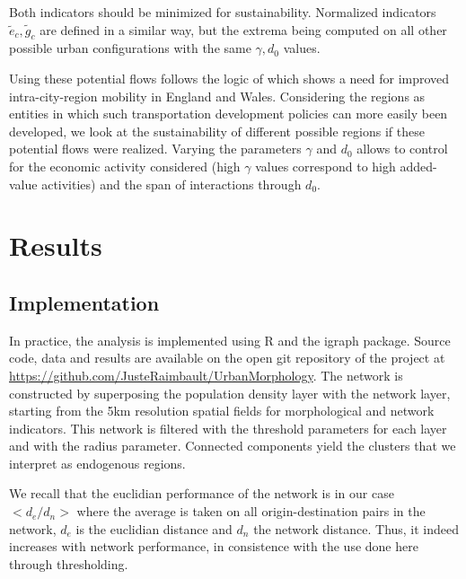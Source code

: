 \documentclass{jimis-en}
\begin{document}
Both indicators should be minimized for sustainability. Normalized indicators $\tilde{e}_c,\tilde{g}_c$ are defined in a similar way, but the extrema being computed on all other possible urban configurations with the same $\gamma,d_0$ values.

Using these potential flows follows the logic of \cite{arbabi2019development} which shows a need for improved intra-city-region mobility in England and Wales. Considering the regions as entities in which such transportation development policies can more easily been developed, we look at the sustainability of different possible regions if these potential flows were realized. Varying the parameters $\gamma$ and $d_0$ allows to control for the economic activity considered (high $\gamma$ values correspond to high added-value activities) and the span of interactions through $d_0$.



\section{Results}

\subsection{Implementation}


In practice, the analysis is implemented using R and the igraph package. Source code, data and results are available on the open git repository of the project at \url{https://github.com/JusteRaimbault/UrbanMorphology}. The network is constructed by superposing the population density layer with the network layer, starting from the 5km resolution spatial fields for morphological and network indicators. This network is filtered with the threshold parameters for each layer and with the radius parameter. Connected components yield the clusters that we interpret as endogenous regions.

We recall that the euclidian performance of the network \citep{banos2012towards} is in our case $<d_e/d_n>$ where the average is taken on all origin-destination pairs in the network, $d_e$ is the euclidian distance and $d_n$ the network distance. Thus, it indeed increases with network performance, in consistence with the use done here through thresholding.
\end{document}
